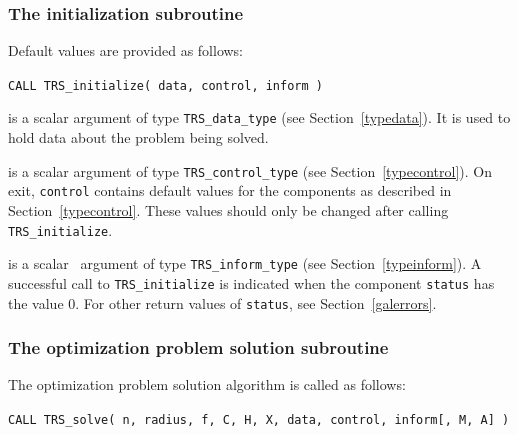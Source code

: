 \documentclass{galahad}
\newcommand{\packagename}{TRS}
\begin{document}
\subsubsection{The initialization subroutine}\label{subinit}
 Default values are provided as follows:

\hskip0.5in
{\tt CALL \packagename\_initialize( data, control, inform )}

\begin{description}

 is a scalar \intentinout argument of type
{\tt \packagename\_data\_type}
(see Section~\ref{typedata}). It is used to hold data about the problem being
solved.

 is a scalar \intentout argument of type
{\tt \packagename\_control\_type}
(see Section~\ref{typecontrol}).
On exit, {\tt control} contains default values for the components as
described in Section~\ref{typecontrol}.
These values should only be changed after calling
{\tt \packagename\_initialize}.

 is a scalar \intentout\ argument of type
{\tt \packagename\_inform\_type}
(see Section~\ref{typeinform}). A successful call to
{\tt \packagename\_initialize}
is indicated when the  component {\tt status} has the value 0.
For other return values of {\tt status}, see Section~\ref{galerrors}.

\end{description}


\subsubsection{The optimization problem solution subroutine}
The optimization problem solution algorithm is called as follows:

\hskip0.5in
{\tt CALL \packagename\_solve( n, radius, f, C, H, X, data, control, inform[, M, A] )}
\end{document}
